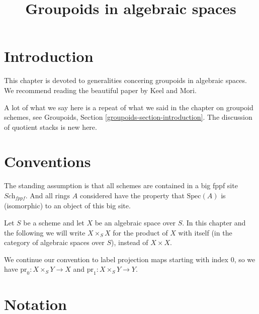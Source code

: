 

%


\title{Groupoids in algebraic spaces}


\maketitle

\label{section-phantom}

\tableofcontents

\section{Introduction}
\label{section-introduction}

\noindent
This chapter is devoted to generalities concering groupoids in algebraic
spaces. We recommend reading the beautiful paper \cite{K-M} by Keel and Mori.

\medskip\noindent
A lot of what we say here is a repeat of what we said in the chapter
on groupoid schemes, see
Groupoids, Section \ref{groupoids-section-introduction}.
The discussion of quotient stacks is new here.


\section{Conventions}
\label{section-conventions}

\noindent
The standing assumption is that all schemes are contained in
a big fppf site $\textit{Sch}_{fppf}$. And all rings $A$ considered
have the property that $\text{Spec}(A)$ is (isomorphic) to an
object of this big site.

\medskip\noindent
Let $S$ be a scheme and let $X$ be an algebraic space over $S$.
In this chapter and the following we will write $X \times_S X$
for the product of $X$ with itself (in the category of algebraic
spaces over $S$), instead of $X \times X$.

\medskip\noindent
We continue our convention to label projection maps starting with
index $0$, so we have $\text{pr}_0 : X \times_S Y \to X$ and
$\text{pr}_1 : X \times_S Y \to Y$.




\section{Notation}
\label{section-notation}

